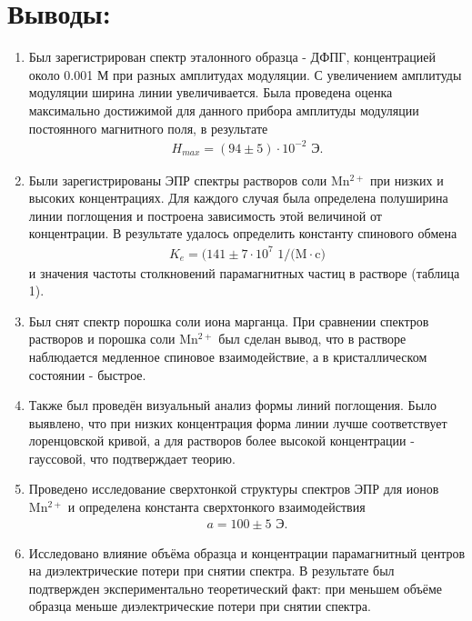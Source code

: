 \documentclass[a4paper,14pt]{article}
\begin{document}
\section{Выводы:}
\begin{enumerate}
	\item Был зарегистрирован спектр эталонного образца - ДФПГ, концентрацией около 0.001 М при разных амплитудах модуляции. С увеличением амплитуды модуляции ширина линии увеличивается. Была проведена оценка максимально достижимой для данного прибора амплитуды модуляции постоянного магнитного поля, в результате
	\begin{gather*}
		H_{max} = (94 \pm 5) \cdot 10^{-2} \text{ Э}.
	\end{gather*} 
	\item Были зарегистрированы ЭПР спектры растворов соли $ \mathrm{Mn^{2+}} $ при низких и высоких концентрациях. Для каждого случая была определена полуширина линии поглощения и построена зависимость этой величиной от концентрации. В результате удалось определить константу спинового обмена 
	\begin{gather*}
		K_e = (141 \pm 7 \cdot 10^7 \text{ 1/(M} \cdot\text{c)}
	\end{gather*}
	и значения частоты столкновений парамагнитных частиц в растворе (таблица 1).
	\item 
	Был снят спектр порошка соли иона марганца. При сравнении спектров растворов и порошка соли $ \mathrm{Mn^{2+}} $ был сделан вывод, что в растворе наблюдается медленное спиновое взаимодействие, а в кристаллическом состоянии - быстрое.
	\item 
	Также был проведён визуальный анализ формы линий поглощения. Было выявлено, что при низких концентрация форма линии лучше соответствует лоренцовской кривой, а для растворов более высокой концентрации - гауссовой, что подтверждает теорию.
	\item
	Проведено исследование сверхтонкой структуры спектров ЭПР для ионов $ \mathrm{Mn^{2+}} $ и определена константа сверхтонкого взаимодействия 
	\begin{gather*}
		a=100\pm 5 \text{ Э.}
	\end{gather*}
	\item 
	Исследовано влияние объёма образца и концентрации парамагнитный центров на диэлектрические потери при снятии спектра. В результате был подтвержден экспериментально теоретический факт: при меньшем объёме образца меньше диэлектрические потери при снятии спектра.
\end{enumerate}
\end{document}
